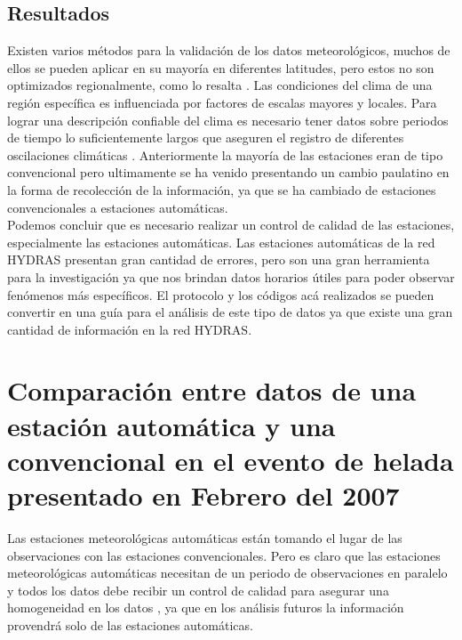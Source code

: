 \documentclass[11pt]{article}
\begin{document}
\subsection{Resultados}


Existen varios métodos para la validación de los datos meteorológicos, muchos de ellos se pueden aplicar en su mayoría en diferentes latitudes, pero estos no son optimizados regionalmente, como lo resalta \citet{espinar2012controlling}. Las condiciones del clima de una región específica es influenciada por factores de escalas mayores y locales. Para lograr una descripción confiable del clima es necesario tener datos sobre periodos de tiempo lo suficientemente largos que aseguren el registro de diferentes oscilaciones climáticas \citep{kaspar2016climate}. Anteriormente la mayoría de las estaciones eran de tipo convencional pero ultimamente se ha venido presentando un cambio paulatino en la forma de recolección de la información, ya que se ha cambiado de estaciones convencionales a estaciones automáticas.\\

Podemos concluir que es necesario realizar un control de calidad de las estaciones, especialmente las estaciones automáticas. Las estaciones automáticas de la red HYDRAS presentan gran cantidad de errores, pero son una gran herramienta para la investigación ya que nos brindan datos horarios útiles para poder observar fenómenos más específicos. El protocolo y los códigos acá realizados se pueden convertir en una guía para el análisis de este tipo de datos ya que existe una gran cantidad de información en la red HYDRAS.


\section{Comparación entre datos de una estación automática y una convencional en el evento de helada presentado en Febrero del 2007}


Las estaciones meteorológicas automáticas están tomando el lugar de las observaciones con las estaciones convencionales. Pero es claro que las estaciones meteorológicas automáticas necesitan de un periodo de observaciones en paralelo y todos los datos debe recibir un control de calidad para asegurar una homogeneidad en los datos \citep{Ying2004}, ya que en los análisis futuros la información provendrá solo de las estaciones automáticas.
\end{document}
